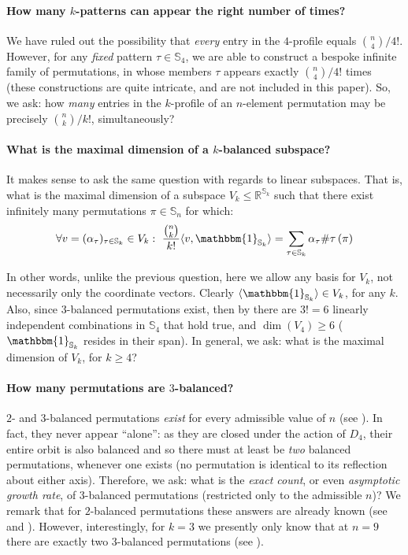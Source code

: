 \documentclass{article}
\newcommand{\threeb}{$3$-balanced\xspace}
\newcommand{\Sn}{\mathbb{S}_n}
\newcommand{\RR}{\mathbb{R}}
\newcommand{\pc}[2]{{\# \mathtt{ #1 } \left( #2 \right)}}
\theoremstyle{remark}
\theoremstyle{plain}
\begin{document}
\paragraph{How many $k$-patterns can appear the right number of times?}
We have ruled out the possibility
that \textit{every} entry in the $4$-profile equals $\binom{n}{4}/4!$.
However, for any \textit{fixed} pattern $\tau \in \mathbb{S}_4$, we are able
to construct a bespoke infinite family of permutations, in whose members $\tau$ appears exactly $\binom{n}{4}/4!$ times
(these constructions are quite intricate, and are not included in this paper).
So, we ask: how \textit{many} entries in the $k$-profile of an $n$-element permutation may be precisely $\binom{n}{k}/k!$, simultaneously? 

\paragraph{What is the maximal dimension of a $k$-balanced subspace?} 
It makes sense to ask the same question with regards to linear subspaces.
That is, what is the maximal dimension of a subspace $V_k \le \RR^{\mathbb{S}_k}$ such that there exist infinitely many permutations $\pi \in \Sn$ for which:
\[
    \forall v = (\alpha_{\tau})_{\tau \in \mathbb{S}_k} \in V_k:\ \frac{\binom{n}{k}}{k!} \langle v, \mathbbm{1}_{\mathbb{S}_k} \rangle = \sum_{\tau \in \mathbb{S}_k} \alpha_\tau \pc{\tau}{\pi}
\]

In other words, unlike the previous question, here we allow any basis for $V_k$, not necessarily only the coordinate vectors.
Clearly $\langle \mathbbm{1}_{\mathbb{S}_k} \rangle \in V_k$, for any $k$. Also, since $3$-balanced permutations exist, then by  there
are $3!=6$ linearly independent combinations in $\mathbb{S}_4$ that hold true, and $\dim(V_4) \ge 6$ ($\mathbbm{1}_{\mathbb{S}_k}$ resides in their span). In general, we ask: what is the maximal dimension of $V_k$, for $k \ge 4$?

\paragraph{How many permutations are $3$-balanced?} $2$- and $3$-balanced permutations \textit{exist} for every admissible value of $n$ (see ). In fact, they never appear ``alone'': as they are closed under the action of $D_4$, their entire orbit is also balanced and so there must at least be \textit{two} balanced permutations, whenever one exists (no permutation is identical to its reflection about either axis). Therefore, we ask: what is the \textit{exact count}, or even \textit{asymptotic growth rate}, of $3$-balanced permutations (restricted only to the admissible $n$)? We remark that for $2$-balanced permutations these answers are already known (see \cite[A316775]{oeis} and \cite[A000140]{oeis}). However, interestingly, for $k=3$ we presently only know that at $n=9$ there are exactly two \threeb permutations (see ).
 

\end{document}
